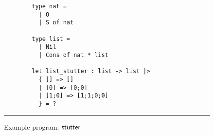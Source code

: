 \begin{figure}
  \begin{center}
    \begin{minipage}{0.625\textwidth}
      \begin{lstlisting}
        type nat =
          | O
          | S of nat

        type list =
          | Nil
          | Cons of nat * list

        let list_stutter : list -> list |>
          { [] => []
          | [0] => [0;0]
          | [1;0] => [1;1;0;0]
          } = ?
      \end{lstlisting}
    \end{minipage}
  \end{center}
\hrule
\caption{Example \myth{} program: $\mathsf{stutter}$}
\label{fig:myth-stutter}
\end{figure}
